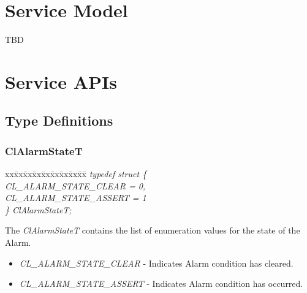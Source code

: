 \begin{flushleft}
\chapter{Service Model}
TBD

\chapter{Service APIs}




\section{Type Definitions}


\subsection{ClAlarmStateT}
\begin{tabbing}
xx\=xx\=xx\=xx\=xx\=xx\=xx\=xx\=xx\=\kill
\textit{typedef struct \{}\\
\>\>\>\>\textit{CL\_ALARM\_STATE\_CLEAR = 0,}\\
\>\>\>\>\textit{CL\_ALARM\_STATE\_ASSERT = 1}\\
\textit{\} ClAlarmStateT;}\end{tabbing}
The \textit{ClAlarmStateT} contains the list of enumeration values for the state of the Alarm.
\begin{itemize}
\item
\textit{CL\_\-ALARM\_\-STATE\_\-CLEAR} - Indicates Alarm condition has cleared. 
\item
\textit{CL\_\-ALARM\_\-STATE\_\-ASSERT} - Indicates Alarm condition has occurred.
\end{itemize}



\end{flushleft}
